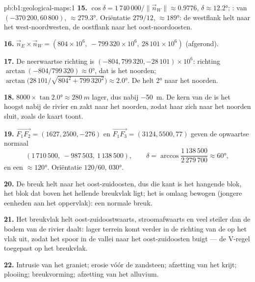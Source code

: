 \begin{solution}{pb:b1:geological-maps:1}
\textbf{15.} $\cos\delta = 1\,740\,000/\|\vec n_W\| \approx 0.9776$, $\delta
\approx \ang{12.2}$; :  van $(-370\,200, 60\,800)$,
$\approx \ang{279.3}$. Oriëntatie $279/12$,  $\approx \ang{189}$: de westflank helt naar het
west-noordwesten, de oostflank naar het oost-noordoosten.

\textbf{16.} $\vec n_E \times \vec n_W = (804 \times 10^6,\ -799\,320 \times
10^6,\ 28\,101 \times 10^6)$ (afgerond).

\textbf{17.} De neerwaartse richting is $(-804, 799\,320, -28\,101) \times
10^6$: richting $\arctan(-804/799\,320) \approx \ang{0}$, dat is het noorden;  $\arctan\bigl(28\,101/\sqrt{804^2 + 799\,320^2}\bigr) \approx \ang{2.0}$. De
 helt \ang{2} naar het noorden.

\textbf{18.} $8000 \times \tan\ang{2.0} \approx \qty{280}{m}$ lager, dus nabij
\qty{-50}{m}. De kern van de  is het hoogst nabij de rivier en zakt naar het noorden,
zodat haar  zich naar het noorden sluit, zoals de kaart toont.

\textbf{19.} $\overrightarrow{F_1F_2} = (1627, 2500, -276)$ en
$\overrightarrow{F_1F_3} = (3124, 5500, 77)$ geven de opwaartse normaal
\[
  (1\,710\,500,\ -987\,503,\ 1\,138\,500), \qquad
  \delta = \arccos\frac{1\,138\,500}{2\,279\,700} \approx \ang{60},
\]
en een  $\approx \ang{120}$. Oriëntatie $120/60$, 
\ang{030}.

\textbf{20.} De breuk helt naar het oost-zuidoosten, dus die kant is het hangende blok, het blok dat boven
het hellende breukvlak ligt; het is omlaag bewogen (jongere eenheden aan het oppervlak): een normale breuk.

\textbf{21.} Het breukvlak helt oost-zuidoostwaarts, stroomafwaarts en veel steiler dan de bodem van de
rivier daalt: lager terrein komt verder in de richting van de  op het vlak uit, zodat het spoor in de
vallei naar het oost-zuidoosten buigt --- de V-regel toegepast op het breukvlak.

\textbf{22.} Intrusie van het graniet; erosie vóór de zandsteen; afzetting van het krijt; plooiing;
breukvorming; afzetting van het alluvium.


\end{solution}
